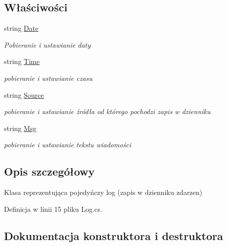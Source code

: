 \subsection*{Właściwości}
\begin{DoxyCompactItemize}
\item 
string \hyperlink{class_z_s_t_1_1_log_a18e6ee60e833732b553f991aca086217}{Date}
\begin{DoxyCompactList}\small\item\em Pobieranie i ustawianie daty \end{DoxyCompactList}\item 
string \hyperlink{class_z_s_t_1_1_log_a80ca6c06e14d09edc94cbd0c0e21b8ee}{Time}
\begin{DoxyCompactList}\small\item\em pobieranie i ustawianie czasu \end{DoxyCompactList}\item 
string \hyperlink{class_z_s_t_1_1_log_a341d360d9362ea78c23dcfdde1ad3075}{Source}
\begin{DoxyCompactList}\small\item\em pobieranie i ustawianie źródła od którego pochodzi zapis w dzienniku \end{DoxyCompactList}\item 
string \hyperlink{class_z_s_t_1_1_log_a66573e9f4fe9a03aa42c2106b23c7b69}{Msg}
\begin{DoxyCompactList}\small\item\em pobieranie i ustawianie tekstu wiadomości \end{DoxyCompactList}\end{DoxyCompactItemize}


\subsection{Opis szczegółowy}
Klasa reprezentująca pojedyńczy log (zapis w dzienniku zdarzen) 



Definicja w linii 15 pliku Log.\+cs.



\subsection{Dokumentacja konstruktora i destruktora}
\hypertarget{class_z_s_t_1_1_log_a07cddad83ae898c2c6013a2b5c20d6d8}{}
